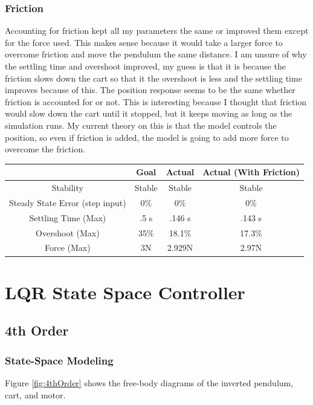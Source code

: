 \documentclass{article}
\begin{document}
\subsubsection{Friction}

Accounting for friction kept all my parameters the same or improved them except for the force used. This makes sense because it would take a larger force to overcome friction and move the pendulum the same distance. I am unsure of why the settling time and overshoot improved, my guess is that it is because the friction slows down the cart so that it the overshoot is less and the settling time improves because of this. The position response seems to be the same whether friction is accounted for or not. This is interesting because I thought that friction would slow down the cart until it stopped, but it keeps moving as long as the simulation runs. My current theory on this is that the model controls the position, so even if friction is added, the model is going to add more force to overcome the friction.

\begin{center}
\begin{tabular}{|c | c | c | c|} 
\hline
 & Goal & Actual & Actual (With Friction)\\ 
\hline
Stability &  Stable & Stable & Stable\\ 
\hline
Steady State Error (step input)  & 0\% & 0\% & 0\%\\ 
\hline
Settling Time (Max) & .5 s & .146 s & .143 s \\
\hline
Overshoot (Max)& 35\% & 18.1\% & 17.3\% \\
\hline
Force (Max) & 3N & 2.929N & 2.97N\\
\hline
\end{tabular}
\end{center}

\section{LQR State Space Controller}
\subsection{4th Order}
\subsubsection{State-Space Modeling}
Figure \ref{fig:4thOrder} shows the free-body diagrams of the inverted pendulum, cart, and motor.
\end{document}
